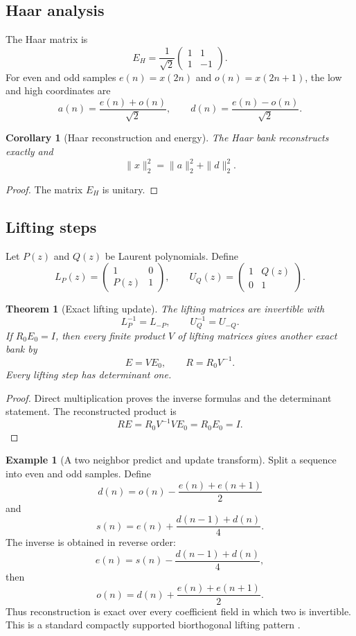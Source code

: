 \documentclass[11pt,letterpaper]{article}
\newtheorem{theorem}{Theorem}[section]
\theoremstyle{plain}
\theoremstyle{plain}
\theoremstyle{plain}
\newtheorem{corollary}[corollary]{Corollary}
\theoremstyle{definition}
\theoremstyle{definition}
\newtheorem{example}[example]{Example}
\theoremstyle{definition}
\theoremstyle{definition}
\theoremstyle{remark}
\theoremstyle{remark}
\theoremstyle{remark}
\theoremstyle{remark}
\begin{document}
\subsection{Haar analysis}

The Haar matrix is
\[
E_H
=
\frac1{\sqrt2}
\begin{pmatrix}
1&1\\
1&-1
\end{pmatrix}.
\]
For even and odd samples \(e(n)=x(2n)\) and \(o(n)=x(2n+1)\), the low and high coordinates are
\[
a(n)=\frac{e(n)+o(n)}{\sqrt2},
\qquad
d(n)=\frac{e(n)-o(n)}{\sqrt2}.
\]

\begin{corollary}[Haar reconstruction and energy]\label{cor:haar_reconstruction}
The Haar bank reconstructs exactly and
\[
\|x\|_2^2=\|a\|_2^2+\|d\|_2^2.
\]
\end{corollary}

\begin{proof}
The matrix \(E_H\) is unitary.
\end{proof}

\subsection{Lifting steps}

Let \(P(z)\) and \(Q(z)\) be Laurent polynomials. Define
\[
L_P(z)
=
\begin{pmatrix}
1&0\\
P(z)&1
\end{pmatrix},
\qquad
U_Q(z)
=
\begin{pmatrix}
1&Q(z)\\
0&1
\end{pmatrix}.
\]

\begin{theorem}[Exact lifting update]\label{thm:lifting_update}
The lifting matrices are invertible with
\[
L_P^{-1}=L_{-P},
\qquad
U_Q^{-1}=U_{-Q}.
\]
If \(R_0E_0=I\), then every finite product \(V\) of lifting matrices gives another exact bank by
\[
E=VE_0,
\qquad
R=R_0V^{-1}.
\]
Every lifting step has determinant one.
\end{theorem}

\begin{proof}
Direct multiplication proves the inverse formulas and the determinant statement. The reconstructed product is
\[
RE
=R_0V^{-1}VE_0
=R_0E_0
=I.
\]
\end{proof}

\begin{example}[A two neighbor predict and update transform]\label{ex:predict_update}
Split a sequence into even and odd samples. Define
\[
d(n)
=o(n)-\frac{e(n)+e(n+1)}2
\]
and
\[
s(n)
=e(n)+\frac{d(n-1)+d(n)}4.
\]
The inverse is obtained in reverse order:
\[
e(n)
=s(n)-\frac{d(n-1)+d(n)}4,
\]
then
\[
o(n)
=d(n)+\frac{e(n)+e(n+1)}2.
\]
Thus reconstruction is exact over every coefficient field in which two is invertible. This is a standard compactly supported biorthogonal lifting pattern \cite{CohenDaubechiesFeauveau1992,Sweldens1996,DaubechiesSweldens1998}.
\end{example}
\end{document}
